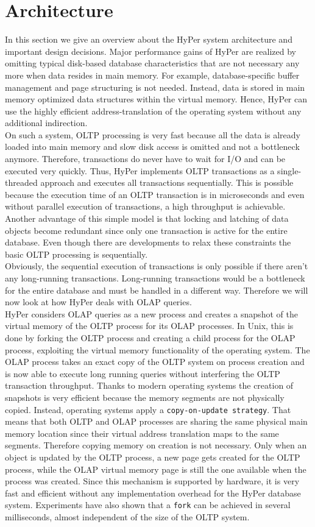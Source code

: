 \section{Architecture}
In this section we give an overview about the HyPer system architecture and important design decisions. Major performance gains of HyPer are realized by omitting typical disk-based database characteristics that are not necessary any more when data resides in main memory. For example, database-specific buffer management and page structuring is not needed. Instead, data is stored in main memory optimized data structures within the virtual memory. Hence, HyPer can use the highly efficient address-translation of the operating system without any additional indirection.
\\
On such a system, OLTP processing is very fast because all the data is already loaded into main memory and slow disk access is omitted and not a bottleneck anymore. Therefore, transactions do never have to wait for I/O and can be executed very quickly. Thus, HyPer implements OLTP transactions as a single-threaded approach and executes all transactions sequentially. This is possible because the execution time of an OLTP transaction is in microseconds and even without parallel execution of transactions, a high throughput is achievable. Another advantage of this simple model is that locking and latching of data objects become redundant since only one transaction is active for the entire database. Even though there are developments to relax these constraints the basic OLTP processing is sequentially.
\\
Obviously, the sequential execution of transactions is only possible if there aren’t any long-running transactions. Long-running transactions would be a bottleneck for the entire database and must be handled in a different way. Therefore we will now look at how HyPer deals with OLAP queries.
\\
HyPer considers OLAP queries as a new process and creates a snapshot of the virtual memory of the OLTP process for its OLAP processes. In Unix, this is done by forking the OLTP process and creating a child process for the OLAP process, exploiting the virtual memory functionality of the operating system. The OLAP process takes an exact copy of the OLTP system on process creation and is now able to execute long running queries without interfering the OLTP transaction throughput. Thanks to modern operating systems the creation of snapshots is very efficient because the memory segments are not physically copied. Instead, operating systems apply a \texttt{copy-on-update strategy}. That means that both OLTP and OLAP processes are sharing the same physical main memory location since their virtual address translation maps to the same segments. Therefore copying memory on creation is not necessary. Only when an object is updated by the OLTP process, a new page gets created for the OLTP process, while the OLAP virtual memory page is still the one available when the process was created. Since this mechanism is supported by hardware, it is very fast and efficient without any implementation overhead for the HyPer database system. Experiments have also shown that a \texttt{fork} can be achieved in several milliseconds, almost independent of the size of the OLTP system.
